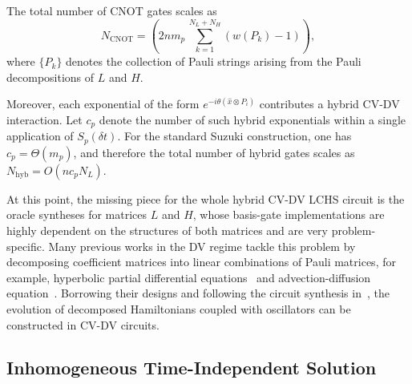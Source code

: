 \documentclass{article}
\begin{document}
The total number of CNOT gates scales as
\begin{equation}
    N_{\mathrm{CNOT}}
    =
    \!\left(
    2nm_{p}\,
    \sum_{k=1}^{N_L+N_H} (w(P_k)-1)
    \right),
    \label{eq:cnot_scaling_suzuki}
\end{equation}
where $\{P_k\}$ denotes the collection of Pauli strings arising from the Pauli decompositions of $ L$ and $ H$.

Moreover, each exponential of the form $e^{-i\theta(\hat{x}\otimes P_i)}$ contributes a hybrid CV-DV interaction. Let $c_p$ denote the number of such hybrid exponentials within a single application of $S_p(\delta t)$. For the standard Suzuki construction, one has $c_p=\Theta(m_p)$, and therefore the total number of hybrid gates scales as $N_{\mathrm{hyb}} = O\!\left(nc_{p}N_L\right).$



At this point, the missing piece for the whole hybrid CV-DV LCHS circuit is the oracle syntheses for matrices $L$ and $H$, whose basis-gate implementations are highly dependent on the structures of both matrices and are very problem-specific. Many previous works in the DV regime tackle this problem by decomposing coefficient matrices into linear combinations of Pauli matrices, for example, hyperbolic partial differential equations~\cite{PhysRevResearch.6.033246} and advection-diffusion equation~\cite{alipanah2025quantum}. Borrowing their designs and following the circuit synthesis in~\cite{bell2025co}, the evolution of decomposed Hamiltonians coupled with oscillators can be constructed in CV-DV circuits.




\subsection{Inhomogeneous Time-Independent Solution}
\end{document}
